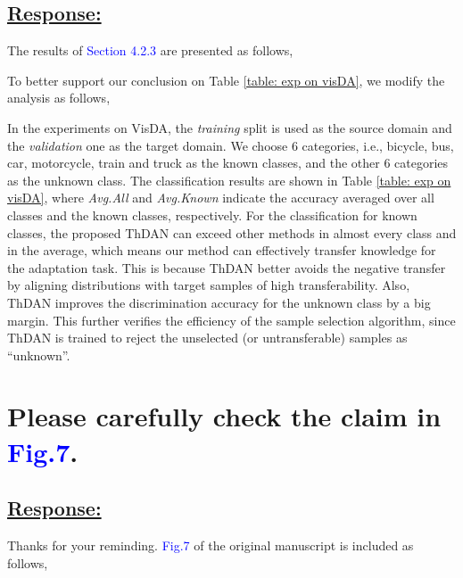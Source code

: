 \subsection*{\underline{\textbf{Response:}}}

The results of \textcolor{blue}{Section 4.2.3} are presented as follows,

To better support our conclusion on Table \ref{table: exp on visDA}, we modify the analysis as follows,
\begin{siderules}
    \small
    In the experiments on VisDA, the \textit{training} split is used as the source domain and the \textit{validation} one as the target domain.
    We choose 6 categories, i.e., bicycle, bus, car, motorcycle, train and truck as the known classes, and the other 6 categories as the unknown class.
    The classification results are shown in Table \ref{table: exp on visDA}, where \textit{Avg.All} and \textit{Avg.Known} indicate the accuracy averaged over all classes and the known classes, respectively.
    For the classification for known classes, the proposed ThDAN can exceed other methods in almost every class and in the average, which means our method can effectively transfer knowledge for the adaptation task.
    This is because ThDAN better avoids the negative transfer by aligning distributions with target samples of high transferability.
    Also, ThDAN improves the discrimination accuracy for the unknown class by a big margin.
    This further verifies the efficiency of the sample selection algorithm, since ThDAN is trained to reject the unselected (or untransferable) samples as ``unknown''. 
\end{siderules}

\section{Please carefully check the claim in \textcolor{blue}{Fig.7}.}
\subsection*{\underline{\textbf{Response:}}}

Thanks for your reminding.
\textcolor{blue}{Fig.7} of the original manuscript is included as follows,


